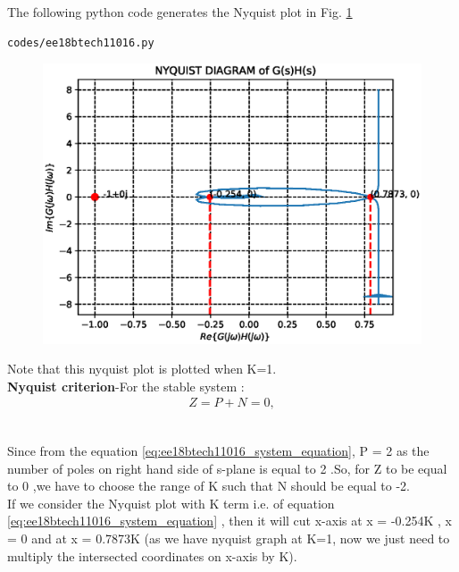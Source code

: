 The following python code generates the Nyquist plot in Fig.  \ref{fig:ee18btech11016}
\begin{lstlisting}
codes/ee18btech11016.py
\end{lstlisting}
%
\begin{figure}[!h]
  \centering
  \includegraphics[width=\columnwidth]{./figs/ee18btech11016.eps}
  \caption{}
  \label{fig:ee18btech11016}
\end{figure}
%
Note that this nyquist plot is plotted when K=1.
\\
 
\textbf{Nyquist criterion}-For the stable system :
\begin{align}
\label{eq:ee18btech11016_system_nyquist}
Z = P+N = 0,    
\end{align}
\begin{table}[!ht]
\centering

\caption{}
\label{table:ee18btech11016}
\end{table}
\\
Since from the equation \eqref{eq:ee18btech11016_system_equation}, P = 2 as the number of poles on right hand side of s-plane is equal to 2 .So, for Z to be equal to 0 ,we have to choose the range of K such that N should be equal to -2.
\\
If we consider the Nyquist plot with K term i.e. of equation \eqref{eq:ee18btech11016_system_equation} , then it will cut x-axis at x = -0.254K , x = 0 and at x = 0.7873K (as we have nyquist graph at K=1, now we just need to multiply the intersected coordinates on x-axis by K). 
\\


